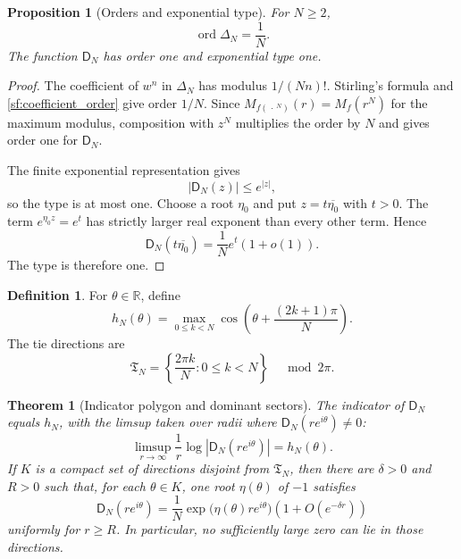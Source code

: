 \documentclass[11pt]{article}
\newtheorem{theorem}{Theorem}[section]
\newtheorem{proposition}[proposition]{Proposition}
\theoremstyle{definition}
\newtheorem{definition}[definition]{Definition}
\theoremstyle{remark}
\newcommand{\Dfun}{\mathsf D}
\newcommand{\ord}{\operatorname{ord}}
\begin{document}
\begin{proposition}[Orders and exponential type]\label{prop:orders}
For $N\geq2$,
\[
\ord\Delta_N=\frac1N.
\]
The function $\Dfun_N$ has order one and exponential type one.
\end{proposition}

\begin{proof}
The coefficient of $w^n$ in $\Delta_N$ has modulus $1/(Nn)!$.
Stirling's formula and \cref{sf:coefficient_order} give order $1/N$.
Since $M_{f(\,\cdot\,^N)}(r)=M_f(r^N)$ for the maximum modulus,
composition with $z^N$ multiplies the order by $N$ and gives order one
for $\Dfun_N$.

The finite exponential representation gives
\[
|\Dfun_N(z)|\leq e^{|z|},
\]
so the type is at most one.  Choose a root $\eta_0$ and put $z=t\overline{\eta_0}$ with $t>0$.  The term $e^{\eta_0z}=e^t$ has strictly larger real exponent than every other term.  Hence
\[
\Dfun_N(t\overline{\eta_0})
=
\frac1Ne^t(1+o(1)).
\]
The type is therefore one.
\end{proof}


\begin{definition}\label{def:indicator_polygon}
For $\theta\in\mathbb R$, define
\[
h_N(\theta)
=
\max_{0\leq k<N}
\cos\left(\theta+\frac{(2k+1)\pi}{N}\right).
\]
The tie directions are
\[
\mathfrak T_N
=
\left\{\frac{2\pi k}{N}:0\leq k<N\right\}
\quad\bmod 2\pi.
\]
\end{definition}

\begin{theorem}[Indicator polygon and dominant sectors]\label{thm:indicator_polygon}
The indicator of $\Dfun_N$ equals $h_N$, with the limsup taken over radii where $\Dfun_N(re^{i\theta})\ne0$:
\[
\limsup_{r\to\infty}
\frac1r\log|\Dfun_N(re^{i\theta})|
=
h_N(\theta).
\]
If $K$ is a compact set of directions disjoint from $\mathfrak T_N$, then there are $\delta>0$ and $R>0$ such that, for each $\theta\in K$, one root $\eta(\theta)$ of $-1$ satisfies
\[
\Dfun_N(re^{i\theta})
=
\frac1N
\exp\bigl(\eta(\theta)re^{i\theta}\bigr)
\left(1+O(e^{-\delta r})\right)
\]
uniformly for $r\geq R$.  In particular, no sufficiently large zero can lie in those directions.
\end{theorem}
\end{document}

